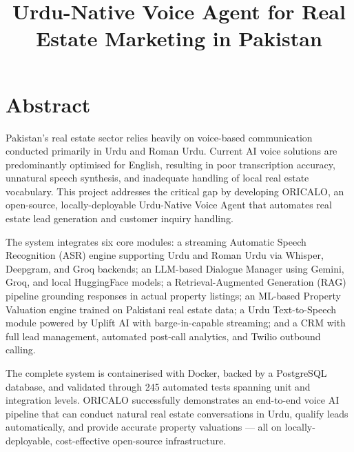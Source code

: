 \documentclass{fast-nuces-bs}
\title{Urdu-Native Voice Agent for Real Estate Marketing in Pakistan}
\begin{document}
\chapter*{Abstract}

Pakistan's real estate sector relies heavily on voice-based communication conducted primarily in Urdu and Roman Urdu. Current AI voice solutions are predominantly optimised for English, resulting in poor transcription accuracy, unnatural speech synthesis, and inadequate handling of local real estate vocabulary. This project addresses the critical gap by developing ORICALO, an open-source, locally-deployable Urdu-Native Voice Agent that automates real estate lead generation and customer inquiry handling.

The system integrates six core modules: a streaming Automatic Speech Recognition (ASR) engine supporting Urdu and Roman Urdu via Whisper, Deepgram, and Groq backends; an LLM-based Dialogue Manager using Gemini, Groq, and local HuggingFace models; a Retrieval-Augmented Generation (RAG) pipeline grounding responses in actual property listings; an ML-based Property Valuation engine trained on Pakistani real estate data; a Urdu Text-to-Speech module powered by Uplift AI with barge-in-capable streaming; and a CRM with full lead management, automated post-call analytics, and Twilio outbound calling.

The complete system is containerised with Docker, backed by a PostgreSQL database, and validated through 245 automated tests spanning unit and integration levels. ORICALO successfully demonstrates an end-to-end voice AI pipeline that can conduct natural real estate conversations in Urdu, qualify leads automatically, and provide accurate property valuations --- all on locally-deployable, cost-effective open-source infrastructure.









\end{document}
